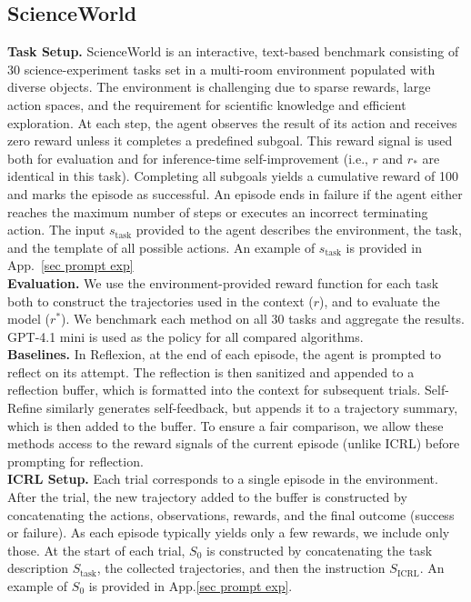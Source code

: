 \documentclass{article}
\newcommand{\0}{\mathbf{0}}
\newcommand{\icrl}{\text{ICRL}}
\begin{document}
\subsection{ScienceWorld}
\textbf{Task Setup.}
ScienceWorld \citep{wang_scienceworld_2022} is an interactive, text-based benchmark consisting of 30 science-experiment tasks set in a multi-room environment populated with diverse objects.
The environment is challenging due to sparse rewards, large action spaces, and the requirement for scientific knowledge and efficient exploration. At each step, the agent observes the result of its action and receives zero reward unless it completes a predefined subgoal. This reward signal is used both for evaluation and for inference-time self-improvement (i.e., $r$ and $r_*$ are identical in this task). Completing all subgoals yields a cumulative reward of 100 and marks the episode as successful. An episode ends in failure if the agent either reaches the maximum number of steps or executes an incorrect terminating action.
The input $s_\text{task}$ provided to the agent describes the environment, the task, and the template of all possible actions. An example of $s_\text{task}$ is provided in App.~\ref{sec prompt exp} \\
\textbf{Evaluation.}
We use the environment-provided reward function for each task both to construct the trajectories used in the context ($r$), and to evaluate the model ($r^*$). We benchmark each method on all 30 tasks and aggregate the results. GPT-4.1 mini is used as the policy for all compared algorithms. \\
\textbf{Baselines.}
In Reflexion, at the end of each episode, the agent is prompted to reflect on its attempt. The reflection is then sanitized and appended to a reflection buffer, which is formatted into the context for subsequent trials. Self-Refine similarly generates self-feedback, but appends it to a trajectory summary, which is then added to the buffer.
To ensure a fair comparison, we allow these methods access to the reward signals of the current episode (unlike ICRL) before prompting for reflection. \\
\textbf{ICRL Setup.}
Each trial corresponds to a single episode in the environment. After the trial, the new trajectory added to the buffer is constructed by concatenating the actions, observations, rewards, and the final outcome (success or failure). As each episode typically yields only a few rewards, we include only those. At the start of each trial, $S_0$ is constructed by concatenating the task description $S_\text{task}$, the collected trajectories, and then the instruction $S_\icrl$. An example of $S_0$ is provided in App.\ref{sec prompt exp}. \\
\end{document}
